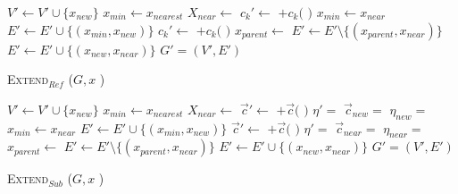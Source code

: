 \documentclass[conference]{IEEEtran}
\begin{document}
\begin{algorithm}
\begin{algorithmic}[1]
\State $ V' \leftarrow V' \cup \{ x_{new} \} $
\State $ x_{min} \leftarrow x_{nearest} $
\State $ X_{near} \leftarrow $ 
		\State $ c_{k}' \leftarrow $  $ + c_{k}( $  $ ) $ 
		\State $ x_{min} \leftarrow x_{near} $
		\EndIf
	\EndIf
\EndFor
\State $ E' \leftarrow E' \cup \{ ( x_{min}, x_{new} ) \} $
	    \State $ c_{k}' \leftarrow $  $ + c_{k}( $  $ ) $ 
			\State $ x_{parent} \leftarrow $ 
			\State $ E' \leftarrow E' \setminus \{ ( x_{parent}, x_{near} ) \} $
			\State $ E' \leftarrow E' \cup \{ ( x_{new}, x_{near} ) \} $
		\EndIf
	\EndIf
\EndFor
\Return $ G' = (V', E') $ 
\end{algorithmic}
\label{alg:morrtstar:extend:ref}
\caption{ \textsc{Extend}$_{Ref} $ ($ G, x$ ) }
\end{algorithm} 

\begin{algorithm}
\begin{algorithmic}[1]
\State $ V' \leftarrow V' \cup \{ x_{new} \} $
\State $ x_{min} \leftarrow x_{nearest} $
\State $ X_{near} \leftarrow $ 
		\State $ \vec{c}' \leftarrow $  $ + \vec{c}( $  $ ) $ 
		\State $ \eta' =  $ 
		\State $ \vec{c}_{new} = $  
		\State $ \eta_{new} = $ 
			\State $ x_{min} \leftarrow x_{near} $
		\EndIf
	\EndIf
\EndFor
\State $ E' \leftarrow E' \cup \{ ( x_{min}, x_{new} ) \} $
		\State $ \vec{c}' \leftarrow $  $ + \vec{c}( $  $ ) $ 
		\State $ \eta' =  $ 
		\State $ \vec{c}_{near} = $  
		\State $ \eta_{near} = $ 
			\State $ x_{parent} \leftarrow $ 
			\State $ E' \leftarrow E' \setminus \{ ( x_{parent}, x_{near} ) \} $
			\State $ E' \leftarrow E' \cup \{ ( x_{new}, x_{near} ) \} $
		\EndIf
	\EndIf
\EndFor
\Return $ G' = (V', E') $ 
\end{algorithmic}
\label{alg:morrtstar:extend:sub}
\caption{ \textsc{Extend}$_{Sub} $ ($ G, x$ ) }
\end{algorithm} 
\end{document}
